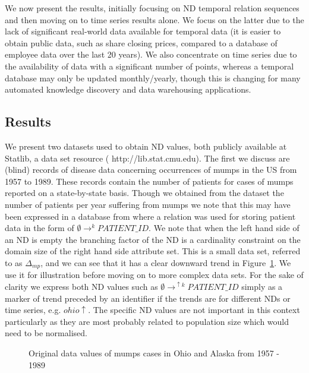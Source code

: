 We now present the results, initially focusing on ND temporal relation
sequences and
then moving on to time series results alone. We focus on the latter
due to the lack of significant real-world data available for temporal
data (it is easier to obtain public data, such as share closing prices,
compared to a database of employee data over the last 20 years). We
also concentrate on time series due to the availability of data with a
significant number of points, whereas a temporal database may only be
updated monthly/yearly, though this is changing for many automated
knowledge discovery and data warehousing applications.


\subsection{Results}\label{subsec:tr_relres}

We present two datasets used to obtain ND values, both publicly
available at Statlib, a data set resource (\ttb
http://lib.stat.cmu.edu\tte). The first we
discuss are (blind) records of disease data concerning occurrences of
mumps in the US from 1957 to 1989. These records contain the number of
patients for cases of mumps reported on a state-by-state
basis. Though we obtained from the dataset the number of patients
per year suffering from mumps we note that this may have been
expressed in a database from where a relation was used for storing
patient data in the form of $\emptyset \to^k PATIENT\_ID$. We note
that when the left hand side of an ND is empty the branching factor of
the ND is a cardinality constraint on the domain size of the right
hand side attribute set. This is a small data set, referred to as
$\Delta_{mp}$, and we can see that
it has a clear downward trend in Figure~\ref{graph:mumps_ohio_1}. We use it for
illustration before moving on to more complex data sets. For the sake
of clarity we express both ND values such as $\emptyset \to^{\uparrow
k} PATIENT\_ID$ 
simply as a marker of trend preceded by an identifier if the trends
are for different NDs or time series, e.g. $ohio\uparrow$. The
specific ND values are not important in this context particularly as
they are most probably related to population size which would need to
be normalised.
\medskip

\begin{figure}
\centerline{}
\caption{\label{graph:mumps_ohio_1}{Original data values of mumps
cases in Ohio and Alaska from 1957 - 1989}}
\end{figure}

